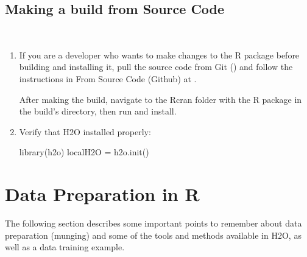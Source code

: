\documentclass[11pt]{article}
\begin{document}
\subsection{Making a build from Source Code} \begin{enumerate}
\item If you are a developer who wants to make changes to the R package before building and installing it, pull the source code from Git () and follow the instructions in From Source Code (Github) at .

After making the build, navigate to the Rcran folder with the R package in the build’s directory, then run and install.


\item Verify that H2O installed properly:
\begin{spverbatim}

 library(h2o)
 localH2O = h2o.init()
\end{spverbatim}
\end{enumerate}

\section{Data Preparation in R}

The following section describes some important points to remember about data preparation (munging) and some of the tools and methods available in H2O, as well as a data training example. 
\end{document}
